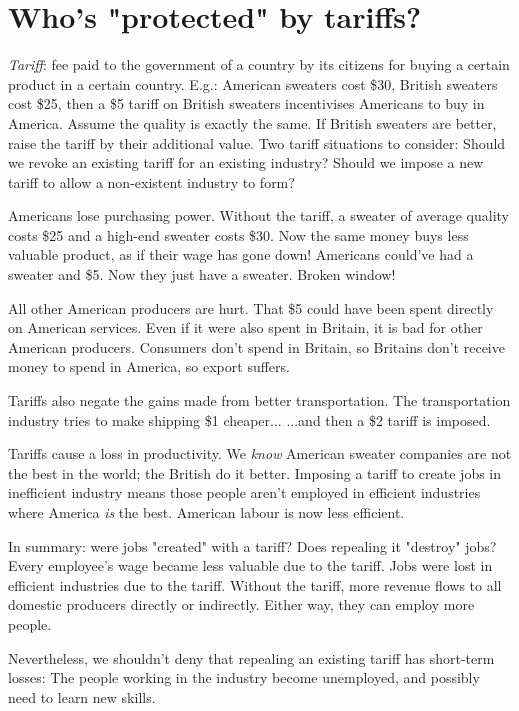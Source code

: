 \section{Who's "protected" by tariffs?}
\begin{outline}
\1 \emph{Tariff}: fee paid to the government of a country by its citizens for buying a certain product in a certain country.
	\2 E.g.: American sweaters cost \$30, British sweaters cost \$25, then a \$5 tariff on British sweaters incentivises Americans to buy in America.
		\3 Assume the quality is exactly the same. If British sweaters are better, raise the tariff by their additional value.
	\2 Two tariff situations to consider:
		\3 Should we revoke an existing tariff for an existing industry?
		\3 Should we impose a new tariff to allow a non-existent industry to form?
		
\1 Americans lose purchasing power. 
	\2 Without the tariff, a sweater of average quality costs \$25 and a high-end sweater costs \$30. Now the same money buys less valuable product, as if their wage has gone down!
	\2 Americans could've had a sweater and \$5. Now they just have a sweater. Broken window!

\1 All other American producers are hurt.
	\2 That \$5 could have been spent directly on American services.
	\2 Even if it were also spent in Britain, it is bad for other American producers. Consumers don't spend in Britain, so Britains don't receive money to spend in America, so export suffers.
	
\1 Tariffs also negate the gains made from better transportation. 
	\2 The transportation industry tries to make shipping \$1 cheaper...
	\2 ...and then a \$2 tariff is imposed.

\1 Tariffs cause a loss in productivity.
	\2 We \emph{know} American sweater companies are not the best in the world; the British do it better.
	\2 Imposing a tariff to create jobs in inefficient industry means those people aren't employed in efficient industries where America \emph{is} the best. American labour is now less efficient.


\1 In summary: were jobs "created" with a tariff? Does repealing it "destroy" jobs?
	\2 Every employee's wage became less valuable due to the tariff.
	\2 Jobs were lost in efficient industries due to the tariff.
	\2 Without the tariff, more revenue flows to all domestic producers directly or indirectly. Either way, they can employ more people.

\1 Nevertheless, we shouldn't deny that repealing an existing tariff has short-term losses:
	\2 The people working in the industry become unemployed, and possibly need to learn new skills.
\end{outline}

